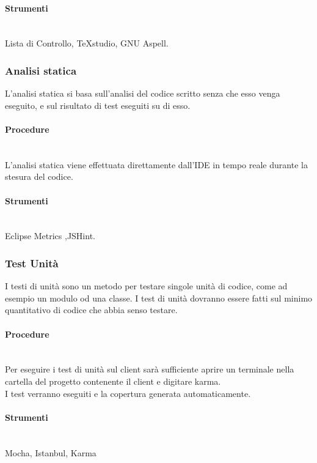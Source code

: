 \paragraph{Strumenti} \hfill \\

Lista di Controllo, TeXstudio, GNU Aspell.


\subsubsection{Analisi statica}
L'analisi statica si basa sull'analisi del codice scritto senza che esso venga eseguito, e sul risultato di test eseguiti su di esso.

\paragraph{Procedure} \hfill \\
L'analisi statica viene effettuata direttamente dall'IDE in tempo reale durante la stesura del codice.
\paragraph{Strumenti} \hfill \\
Eclipse Metrics ,JSHint.



\subsubsection{Test Unità}
I testi di unità sono un metodo per testare singole unità di codice, come ad esempio un modulo od una classe. I test di unità dovranno essere fatti sul minimo quantitativo di codice che abbia senso testare.

\paragraph{Procedure} \hfill \\
Per eseguire i test di unità sul client sarà sufficiente aprire un terminale nella cartella del progetto contenente il client e digitare karma.\\
I test verranno eseguiti e la copertura generata automaticamente.
\paragraph{Strumenti} \hfill \\
Mocha, Istanbul, Karma


